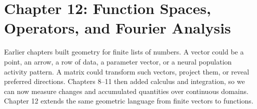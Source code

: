 \section{Chapter 12: Function Spaces, Operators, and Fourier Analysis}
\label{ch:function-spaces-operators-fourier-analysis}

Earlier chapters built geometry for finite lists of numbers. A vector could be a point, an arrow, a row of data, a parameter vector, or a neural population activity pattern. A matrix could transform such vectors, project them, or reveal preferred directions. Chapters 8--11 then added calculus and integration, so we can now measure changes and accumulated quantities over continuous domains. Chapter 12 extends the same geometric language from finite vectors to functions.

